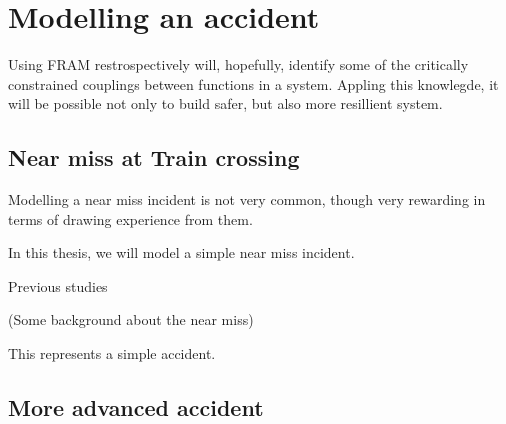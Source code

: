 \chapter{Modelling an accident}
\label{ch:accident_model}
Using FRAM restrospectively will, hopefully, identify some of the critically constrained couplings between functions in a system. Appling this knowlegde, it will be possible not only to build safer, but also more resillient system.

\section{Near miss at Train crossing}
Modelling a near miss incident is not very common, though very rewarding in terms of drawing experience from them.

In this thesis, we will model a simple near miss incident.

Previous studies\cite{belmonte2011interdisciplinary}

\cite{hollnagel2004barriers}

(Some background about the near miss)

This represents a simple accident.

\section{More advanced accident}